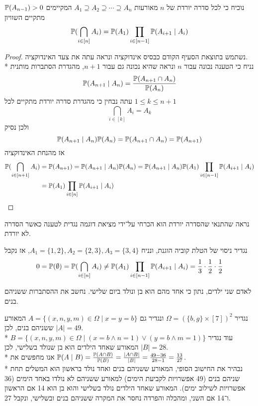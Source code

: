 \Subquestion{}
נוכיח כי לכל סדרה יורדת של $n$ מאורעות $A_1 \supseteq A_2 \supseteq \cdots \supseteq A_n$ המקיימים $\mathbb{P}(A_{n - 1}) > 0$ מתקיים השוויון
\[
	\mathbb{P}(\bigcap_{i \in [n]} A_i) = \mathbb{P}(A_1) \prod_{i \in [n - 1]} \mathbb{P}(A_{i + 1} \mid A_i)
\]
\begin{proof}
	נשתמש בתוצאת הסעיף הקודם כבסיס אינדוקציה ונראה עתה את צעד האינדוקציה. \\*
	נניח כי הטענה נכונה עבור $n$ ונראה שהיא נכונה גם עבור $n + 1$, מהגדרת הסתברות מותנית
	\[
		\mathbb{P}(A_{n + 1} \mid A_n) = \frac{\mathbb{P}(A_{n + 1} \cap A_n)}{\mathbb{P}(A_n)}
	\]
	עתה נבחין כי מהגדרת סדרה יורדת מתקיים לכל $1 \le k \le n + 1$
	\[
		\bigcap_{i \in [k]} A_i = A_k
	\]
	ולכן נסיק
	\[
		\mathbb{P}(A_{n + 1} \mid A_n) \mathbb{P}(A_n) = \mathbb{P}(A_{n + 1} \cap A_n) = \mathbb{P}(A_{n + 1})
	\]
	אז מהנחת האינדוקציה
	\begin{align*}
		\mathbb{P}(\bigcap_{i \in [n + 1]} A_i)
		& = \mathbb{P}(A_{n + 1})
		= \mathbb{P}(A_{n + 1} \mid A_n) \mathbb{P}(A_n)  
		= \mathbb{P}(A_{n + 1} \mid A_n) \mathbb{P}(A_1) \prod_{i \in [n - 1]} \mathbb{P}(A_{i + 1} \mid A_i) \\
		& = \mathbb{P}(A_1) \prod_{i \in [n]} \mathbb{P}(A_{i + 1} \mid A_i)
	\end{align*}
\end{proof}

\Subquestion{}
נראה שהתנאי שהסדרה יורדת הוא הכרחי על־ידי מציאת דוגמה נגדית לטענה כאשר הסדרה לא יורדת.
\begin{solution}
	נגדיר ניסוי של הטלת קוביה הוגנת, ונניח $A_1 = \{1, 2\}, A_2 = \{2, 3\}, A_3 = \{3, 4\}$, אז נקבל
	\[
		0 = \mathbb{P}(\emptyset) = \mathbb{P}(\bigcap_{i \in [n]} A_i) \ne \mathbb{P}(A_1) \prod_{i \in [n - 1]} \mathbb{P}(A_{i + 1} \mid A_i) = \frac{1}{3} \cdot \frac{1}{2} \cdot \frac{1}{2}
	\]
\end{solution}

\Question{}
לאדם שני ילדים, נתון כי אחד מהם הוא בן ונולד ביום שלישי.
נחשב את ההסתברות ששניהם בנים.
\begin{solution}
	נגדיר $\Omega = {(\{b, g\} \times [7])}^2$ ונגדיר גם $A = \{ (x, n, y, m) \in \Omega \mid x = y = b \}$ המאורע ששניהם בנים, לכן $|A| = 49$. \\*
	עוד נגדיר $B = \{ (x, n, y, m) \in \Omega \mid (x = b \land n = 1) \lor (y = b \land m = 1) \}$ המאורע שאחד הילדים הוא בן שנולד בשלישי, לכן $|B| = 28$. \\*
	אנו מחפשים את $\mathbb{P}(A \mid B) = \frac{\mathbb{P}(A \cap B)}{\mathbb{P}(B)} = \frac{|A \cap B|}{|B|} = \frac{49 - 36}{28 - 1} = \frac{13}{27}$. \\*
	נבהיר את החישוב הסופי, המאורע ששניהם בנים ואחד נולד בראשון הוא המשלים תחת שניהם בנים (49 אפשרויות לקביעת הימים) למאורע ששניהם לא נולדו באחד הימים (36 אפשרויות לשילוב ימים).
	המאורע שאחד הילדים נולד בשלישי והוא בן הוא 14 אם הראשון ו־14 אם השני, ומהכלה והפרדה נחסר את המקרה ששניהם בנים ובשלישי, ונקבל 27.
\end{solution}

